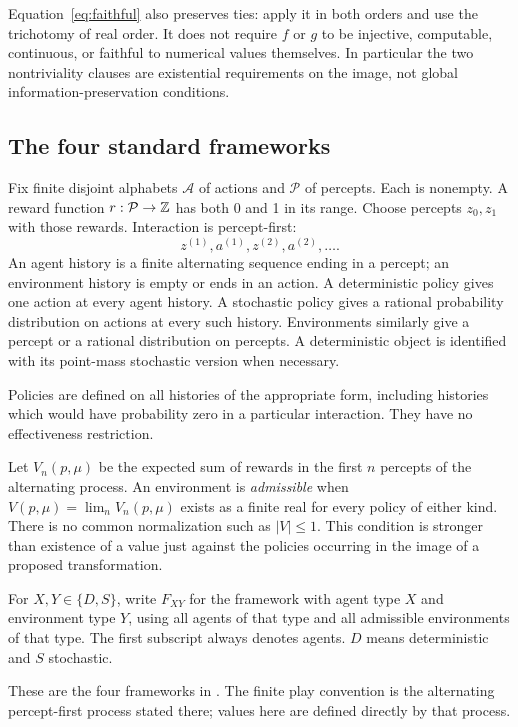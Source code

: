 \documentclass[11pt]{article}
\begin{document}
Equation~\eqref{eq:faithful} also preserves ties: apply it in both
orders and use the trichotomy of real order. It does not require $f$
or $g$ to be injective, computable, continuous, or faithful to numerical
values themselves. In particular the two nontriviality clauses are
existential requirements on the image, not global information-preservation
conditions.

\subsection{The four standard frameworks}

Fix finite disjoint alphabets $\mathcal A$ of actions and $\mathcal P$
of percepts. Each is nonempty. A reward function
$r:\mathcal P\to\mathbb Z$ has both 0 and 1 in its range. Choose percepts
$z_0,z_1$ with those rewards. Interaction is percept-first:
\[
 z^{(1)},a^{(1)},z^{(2)},a^{(2)},\ldots.
\]
An agent history is a finite alternating sequence ending in a percept;
an environment history is empty or ends in an action. A deterministic
policy gives one action at every agent history. A stochastic policy
gives a rational probability distribution on actions at every such
history. Environments similarly give a percept or a rational distribution
on percepts. A deterministic object is identified with its point-mass
stochastic version when necessary.

Policies are defined on all histories of the appropriate form,
including histories which would have probability zero in a particular
interaction. They have no effectiveness restriction.

Let $V_n(p,\mu)$ be the expected sum of rewards in the first $n$
percepts of the alternating process. An environment is \emph{admissible}
when $V(p,\mu)=\lim_n V_n(p,\mu)$ exists as a finite real for every
policy of either kind. There is no common normalization such as
$|V|\le1$. This condition is stronger than existence of a value just
against the policies occurring in the image of a proposed transformation.

\begin{definition}\label{def:four}
For $X,Y\in\{D,S\}$, write $F_{XY}$ for the framework with agent
type $X$ and environment type $Y$, using all agents of that type and
all admissible environments of that type. The first subscript always
denotes agents. $D$ means deterministic and $S$ stochastic.
\end{definition}

These are the four frameworks in \cite[Definition~9]{AP}. The finite
play convention is the alternating percept-first process stated there;
values here are defined directly by that process.
\end{document}
